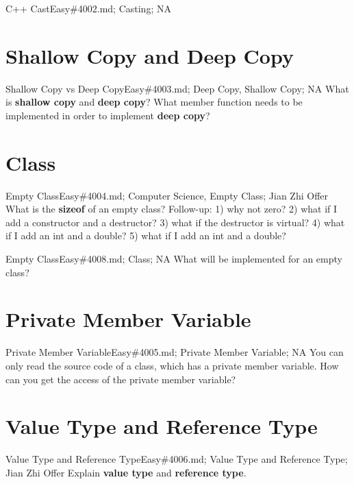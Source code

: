 \documentclass[oldfontcommands]{memoir}
\begin{document}
{\begin{question}{C++ Cast}{Easy}{\#4002.md; Casting; NA}
\end{question}

\section{Shallow Copy and Deep Copy}
\begin{question}{Shallow Copy vs Deep Copy}{Easy}{\#4003.md; Deep Copy, Shallow Copy; NA}
What is {\bf{shallow copy}} and {\bf{deep copy}}? What member function needs to be implemented in order to implement {\bf{deep copy}}?

\end{question}

\section{Class}
\begin{question}{Empty Class}{Easy}{\#4004.md; Computer Science, Empty Class; Jian Zhi Offer}
What is the {\bf{sizeof}} of an empty class? Follow-up: 1) why not zero? 2) what if I add a constructor and a destructor? 3) what if the destructor is virtual? 4) what if I add an int and a double? 5) what if I add an int and a double?

\end{question}

\begin{question}{Empty Class}{Easy}{\#4008.md; Class; NA}
What will be implemented for an empty class?

\end{question}

\section{Private Member Variable}
\begin{question}{Private Member Variable}{Easy}{\#4005.md; Private Member Variable; NA}
You can only read the source code of a class, which has a private member variable. How can you get the access of the private member variable?

\end{question}

\section{Value Type and Reference Type}
\begin{question}{Value Type and Reference Type}{Easy}{\#4006.md; Value Type and Reference Type; Jian Zhi Offer}
Explain {\bf{value type}} and {\bf{reference type}}.


\end{question}}
\end{document}
